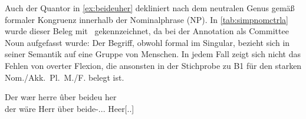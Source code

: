 

Auch der Quantor in \cref{ex:beideuher} dekliniert nach dem neutralen Genus
gemäß formaler Kongruenz innerhalb der Nominalphrase (NP). In
\cref{tab:simpnomctrla} wurde dieser Beleg mit \SA\ gekennzeichnet, da
  bei der Annotation als Committee Noun
\autocite[211--213]{corbett2006} aufgefasst wurde: Der Begriff, obwohl formal
im Singular, bezieht sich in seiner Semantik auf eine Gruppe von Menschen. In
jedem Fall zeigt sich nicht das Fehlen von overter Flexion, die ansonsten in
der Stichprobe zu B1 für den starken Nom./Akk.~Pl.~M./F. belegt ist.

\begin{exe}
\ex \label{ex:beideuher}
	\gll Der wær herre ûber beideu her \\
		der wäre Herr über beide-\Acc.\Pl.\NeutA.\St{} Heer[\Acc.\Pl.\NeutA] \\
	\begin{taggedline}{\parencites[\pno~31rc,3]{kc:B1}[zu][11272\psqq]{schroeder1895}} %
	\trans {}
	\end{taggedline}
\end{exe}

